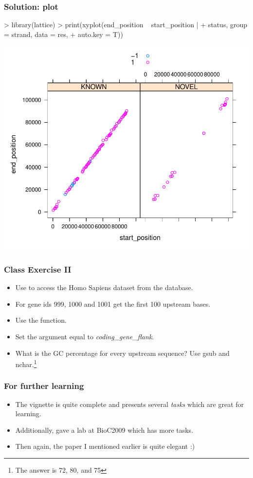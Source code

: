 \begin{frame}
  \frametitle{Solution: plot}
\begin{Schunk}
\begin{Sinput}
> library(lattice)
> print(xyplot(end_position ~ start_position | 
+     status, group = strand, data = res, 
+     auto.key = T))
\end{Sinput}
\end{Schunk}
\includegraphics{plots/fig-010}
\end{frame}

\begin{frame}[allowframebreaks]
  \frametitle{Class Exercise II}
  \begin{itemize}
  \item Use  to access the Homo Sapiens dataset from the  database.
  \item For  gene ids 999, 1000 and 1001 get the first 100 upstream bases.
  \item Use the  function.
  \item Set the  argument equal to \emph{coding\_gene\_flank}.
  \item What is the GC percentage for every upstream sequence? Use \alert{gsub} and \alert{nchar}.\footnote{The answer is 72, 80, and 75}
  \end{itemize}
\end{frame}

\begin{frame}[allowframebreaks]
  \frametitle{For further learning}
  \begin{itemize}
  \item The  vignette is quite complete and presents several \emph{tasks} which are great for learning.
  \item Additionally,  gave a lab at BioC2009 which has more tasks.
  \item Then again, the paper I mentioned earlier is quite elegant :)
  \end{itemize}
\end{frame}


